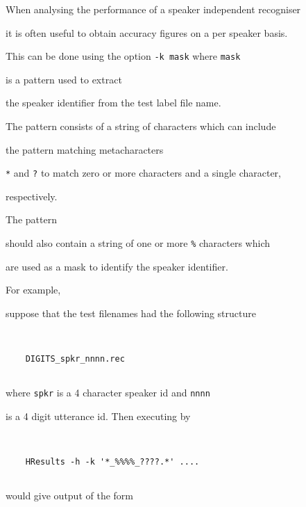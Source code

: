 When analysing the performance of a speaker independent recogniser


it is often useful to obtain accuracy figures on a per speaker basis.


This can be done using the option \texttt{-k mask} where \texttt{mask}


is a pattern used to extract 


the speaker identifier from the test label file name.  


The pattern consists of a string of characters which can include


the pattern matching metacharacters 


\texttt{*} and \texttt{?} to match zero or more characters and a single character,


respectively.


The pattern


should also contain a string of one or more \texttt{\%} characters which


are used as a mask to identify the speaker identifier.  





For example,


suppose that the test filenames had the following structure


\begin{verbatim}


    DIGITS_spkr_nnnn.rec


\end{verbatim}


where \texttt{spkr} is a 4 character speaker id and \texttt{nnnn}


is a 4 digit utterance id.  Then executing  by


\begin{verbatim}


    HResults -h -k '*_%%%%_????.*' ....


\end{verbatim}


would give output of the form


